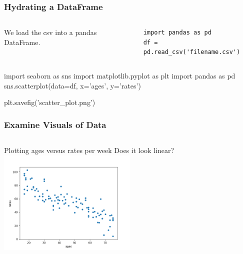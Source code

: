 \documentclass{beamer}
\newcounter{slidenum}
\begin{document}
\begin{frame}[fragile]
	\frametitle{Hydrating a DataFrame}
	\begin{columns}

We load the csv into a pandas DataFrame.
	\begin{lstlisting}
import pandas as pd
df = pd.read_csv('filename.csv')
	\end{lstlisting}
\end{columns}
\end{frame}
\begin{pycode}
import seaborn as sns
import matplotlib.pyplot as plt
import pandas as pd
sns.scatterplot(data=df, x='ages', y='rates')

plt.savefig('scatter_plot.png')
\end{pycode}
\begin{frame}
	\stepcounter{slidenum}
	\frametitle{Examine Visuals of Data}

	\begin{columns}
	Plotting ages versus rates per week
	Does it look linear? 
	\includegraphics[width=\textwidth, height = 5cm]{scatter_plot.png}
\end{columns}
	
\end{frame}
\end{document}
